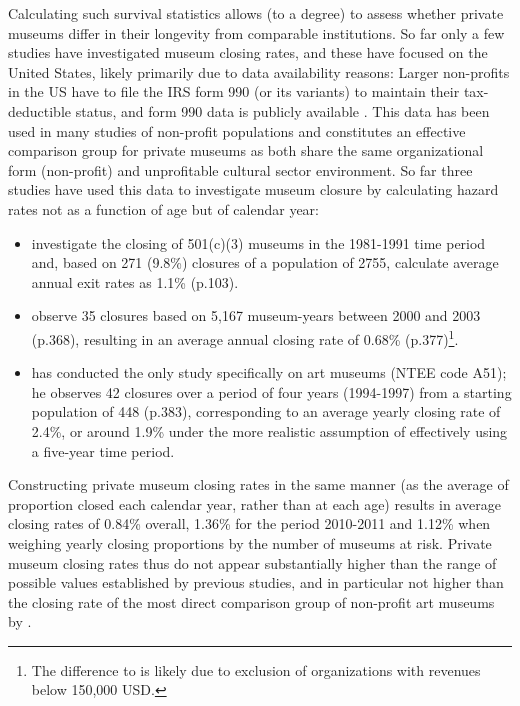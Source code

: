 \documentclass[12pt]{article}
\begin{document}
Calculating such survival statistics allows (to a degree) to assess whether private museums differ in their longevity from comparable institutions.
So far only a few studies have investigated museum closing rates, and these have focused on the United States, likely primarily due to data availability reasons: 
Larger non-profits in the US have to file the IRS form 990 (or its variants) to maintain their tax-deductible status, and form 990 data is publicly available \parencite{Lecy_2023_core}.
This data has been used in many studies of non-profit populations and constitutes an effective comparison group for private museums as both share the same organizational form (non-profit) and unprofitable cultural sector environment.
So far three studies have used this data to investigate museum closure by calculating hazard rates not as a function of age but of calendar year:
\begin{itemize}
\item \textcite{Bowen_etal_1994_charitable} investigate the closing of 501(c)(3) museums in the 1981-1991 time period and, based on 271 (9.8\%) closures of a population of 2755, calculate average annual exit rates as 1.1\% (p.103).
\item \textcite{Gordon_etal_2013_insolvency} observe 35 closures based on 5,167 museum-years between 2000 and 2003 (p.368), resulting in an average annual closing rate of 0.68\% (p.377)\footnote{The difference to \textcite{Bowen_etal_1994_charitable} is likely due to exclusion of organizations with revenues below 150,000 USD.}.
\item \textcite{Hager_2001_vulnerability} has conducted the only study specifically on art museums (NTEE code A51); he observes 42 closures over a period of four years (1994-1997) from a starting population of 448 (p.383), corresponding to an average yearly closing rate of 2.4\%, or around 1.9\% under the more realistic assumption of effectively using a five-year time period.
\end{itemize}

Constructing private museum closing rates in the same manner (as the average of proportion closed each calendar year, rather than at each age) results in average closing rates of 0.84\% overall, 1.36\% for the period 2010-2011 and 1.12\% when weighing yearly closing proportions by the number of museums at risk.
Private museum closing rates thus do not appear substantially higher than the range of possible values established by previous studies, and in particular not higher than the closing rate of the most direct comparison group of non-profit art museums by \textcite{Hager_2001_vulnerability}. 
\end{document}
